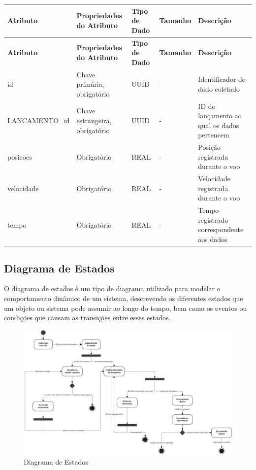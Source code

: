 \begin{longtable}{|p{3.7cm}|p{2.7cm}|p{1.6cm}|p{1.8cm}|p{4cm}|}
\hline
\textbf{Atributo} & \textbf{Propriedades do Atributo} & \textbf{Tipo de Dado} & \textbf{Tamanho} & \textbf{Descrição} \\
\hline
\endfirsthead

\hline
\textbf{Atributo} & \textbf{Propriedades do Atributo} & \textbf{Tipo de Dado} & \textbf{Tamanho} & \textbf{Descrição} \\
\hline
\endhead

id & Chave primária, obrigatório & UUID & - & Identificador do dado coletado \\
\hline
LANCAMENTO\_id & Chave estrangeira, obrigatório & UUID & - & ID do lançamento ao qual os dados pertencem \\
\hline
posicoes & Obrigatório & REAL & - & Posição registrada durante o voo \\
\hline
velocidade & Obrigatório & REAL & - & Velocidade registrada durante o voo \\
\hline
tempo & Obrigatório & REAL & - & Tempo registrado correspondente aos dados \\
\hline
\end{longtable}


\subsection{Diagrama de Estados}
O diagrama de estados é um tipo de diagrama utilizado para modelar o comportamento dinâmico de um sistema, descrevendo os diferentes estados que um objeto ou sistema pode assumir ao longo do tempo, bem como os eventos ou condições que causam as transições entre esses estados.

\begin{landscape}
\begin{figure}
    \centering
    \includegraphics[width=1\linewidth]{editaveis/figuras/diagrama_de_estados.jpg}
    \caption{Diagrama de Estados}
    \label{fig:enter-label}
\end{figure}
\end{landscape}



